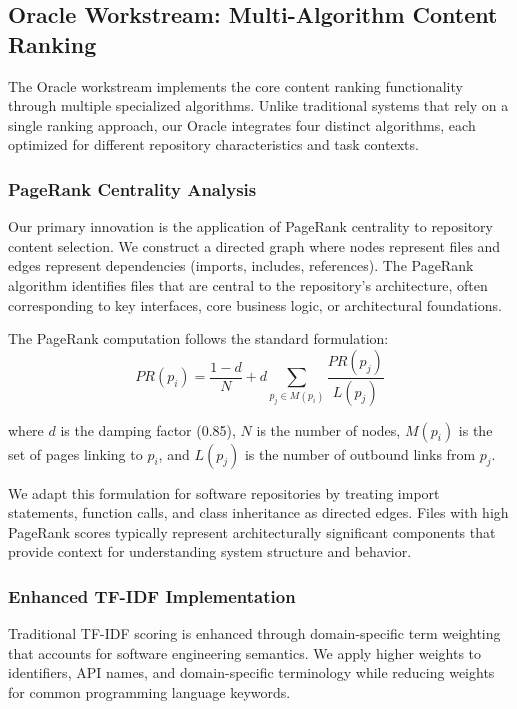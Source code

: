 \documentclass[conference]{IEEEtran}
\begin{document}
\subsection{Oracle Workstream: Multi-Algorithm Content Ranking}

The Oracle workstream implements the core content ranking functionality through multiple specialized algorithms. Unlike traditional systems that rely on a single ranking approach, our Oracle integrates four distinct algorithms, each optimized for different repository characteristics and task contexts.

\subsubsection{PageRank Centrality Analysis}
Our primary innovation is the application of PageRank centrality to repository content selection. We construct a directed graph where nodes represent files and edges represent dependencies (imports, includes, references). The PageRank algorithm identifies files that are central to the repository's architecture, often corresponding to key interfaces, core business logic, or architectural foundations.

The PageRank computation follows the standard formulation:
\begin{equation}
PR(p_i) = \frac{1-d}{N} + d \sum_{p_j \in M(p_i)} \frac{PR(p_j)}{L(p_j)}
\end{equation}

where $d$ is the damping factor (0.85), $N$ is the number of nodes, $M(p_i)$ is the set of pages linking to $p_i$, and $L(p_j)$ is the number of outbound links from $p_j$.

We adapt this formulation for software repositories by treating import statements, function calls, and class inheritance as directed edges. Files with high PageRank scores typically represent architecturally significant components that provide context for understanding system structure and behavior.

\subsubsection{Enhanced TF-IDF Implementation}
Traditional TF-IDF scoring is enhanced through domain-specific term weighting that accounts for software engineering semantics. We apply higher weights to identifiers, API names, and domain-specific terminology while reducing weights for common programming language keywords.
\end{document}
